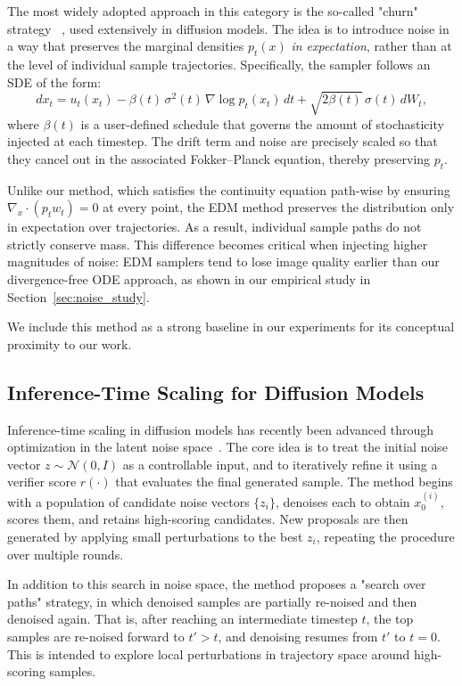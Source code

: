 \documentclass{article}
\begin{document}
The most widely adopted approach in this category is the so-called "churn" strategy ~\cite{karras2022elucidatingdesignspacediffusionbased}, used extensively in diffusion models. The idea is to introduce noise in a way that preserves the marginal densities \(p_t(x)\) \emph{in expectation}, rather than at the level of individual sample trajectories. Specifically, the sampler follows an SDE of the form:
\[
d x_t = u_t(x_t) - \beta(t)\,\sigma^2(t)\,\nabla \log p_t(x_t)\,dt + \sqrt{2\beta(t)}\,\sigma(t)\,dW_t,
\]
where \(\beta(t)\) is a user-defined schedule that governs the amount of stochasticity injected at each timestep. The drift term and noise are precisely scaled so that they cancel out in the associated Fokker–Planck equation, thereby preserving \(p_t\).

Unlike our method, which satisfies the continuity equation path-wise by ensuring \(\nabla_x\!\cdot(p_t w_t)=0\) at every point, the EDM method preserves the distribution only in expectation over trajectories. As a result, individual sample paths do not strictly conserve mass. This difference becomes critical when injecting higher magnitudes of noise: EDM samplers tend to lose image quality earlier than our divergence-free ODE approach, as shown in our empirical study in Section~\ref{sec:noise_study}.

We include this method as a strong baseline in our experiments for its conceptual proximity to our work.

\subsection{Inference-Time Scaling for Diffusion Models}

Inference-time scaling in diffusion models has recently been advanced through optimization in the latent noise space~\cite{ma2025diffits}. The core idea is to treat the initial noise vector \( z \sim \mathcal{N}(0, I) \) as a controllable input, and to iteratively refine it using a verifier score \( r(\cdot) \) that evaluates the final generated sample. The method begins with a population of candidate noise vectors \( \{z_i\} \), denoises each to obtain \( x_0^{(i)} \), scores them, and retains high-scoring candidates. New proposals are then generated by applying small perturbations to the best \( z_i \), repeating the procedure over multiple rounds.

In addition to this search in noise space, the method proposes a "search over paths" strategy, in which denoised samples are partially re-noised and then denoised again. That is, after reaching an intermediate timestep \( t \), the top samples are re-noised forward to \( t' > t \), and denoising resumes from \( t' \) to \( t = 0 \). This is intended to explore local perturbations in trajectory space around high-scoring samples.
\end{document}
